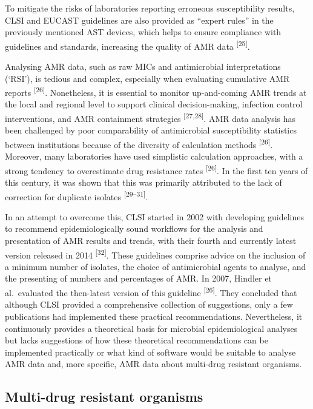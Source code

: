 \documentclass[
]{book}
\begin{document}
To mitigate the risks of laboratories reporting erroneous susceptibility results, CLSI and EUCAST guidelines are also provided as ``expert rules'' in the previously mentioned AST devices, which helps to ensure compliance with guidelines and standards, increasing the quality of AMR data \textsuperscript{{[}25{]}}.

Analysing AMR data, such as raw MICs and antimicrobial interpretations (`RSI'), is tedious and complex, especially when evaluating cumulative AMR reports \textsuperscript{{[}26{]}}. Nonetheless, it is essential to monitor up-and-coming AMR trends at the local and regional level to support clinical decision-making, infection control interventions, and AMR containment strategies \textsuperscript{{[}27,28{]}}. AMR data analysis has been challenged by poor comparability of antimicrobial susceptibility statistics between institutions because of the diversity of calculation methods \textsuperscript{{[}26{]}}. Moreover, many laboratories have used simplistic calculation approaches, with a strong tendency to overestimate drug resistance rates \textsuperscript{{[}26{]}}. In the first ten years of this century, it was shown that this was primarily attributed to the lack of correction for duplicate isolates \textsuperscript{{[}29--31{]}}.

In an attempt to overcome this, CLSI started in 2002 with developing guidelines to recommend epidemiologically sound workflows for the analysis and presentation of AMR results and trends, with their fourth and currently latest version released in 2014 \textsuperscript{{[}32{]}}. These guidelines comprise advice on the inclusion of a minimum number of isolates, the choice of antimicrobial agents to analyse, and the presenting of numbers and percentages of AMR. In 2007, Hindler et al.~evaluated the then-latest version of this guideline \textsuperscript{{[}26{]}}. They concluded that although CLSI provided a comprehensive collection of suggestions, only a few publications had implemented these practical recommendations. Nevertheless, it continuously provides a theoretical basis for microbial epidemiological analyses but lacks suggestions of how these theoretical recommendations can be implemented practically or what kind of software would be suitable to analyse AMR data and, more specific, AMR data about multi-drug resistant organisms.

\hypertarget{multi-drug-resistant-organisms}{%
\subsection{Multi-drug resistant organisms}\label{multi-drug-resistant-organisms}}
\end{document}
